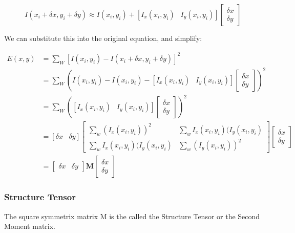 \begin{equation}
    I(x_{i} + \delta x,y_{i} + \delta y) \approx I(x_{i},y_{i}) + [ I_{x}(x_{i},y_{i}) \;\;\: I_{y}(x_{i},y_{i})  ] \begin{bmatrix} \delta x \\ \delta y \end{bmatrix}
\end{equation}

\noindent We can substitute this into the original equation, and simplify:

\begin{align*}
    E(x,y) &= \sum_{W}[ I(x_{i},y_{i}) - I(x_{i} + \delta x,y_{i} + \delta y) ]^2 \\
    &= \sum_{W} (I(x_{i}, y_{i}) - I(x_{i},y_{i}) - [ I_{x}(x_{i},y_{i}) \;\;\: I_{y}(x_{i},y_{i})  ] \begin{bmatrix} \delta x \\ \delta y \end{bmatrix})^2 \\
    &= \sum_{W}([ I_{x}(x_{i},y_{i}) \;\;\: I_{y}(x_{i},y_{i})  ] \begin{bmatrix} \delta x \\ \delta y \end{bmatrix})^2 \\
    &= [\delta x \;\;\; \delta y] \begin{bmatrix} \sum_{w} (I_{x}(x_{i},y_{i}))^2 & \sum_{w} I_{x}(x_{i},y_{i})(I_{y}(x_{i},y_{i}) \\[0.2cm] \sum_{w} I_{x}(x_{i},y_{i})(I_{y}(x_{i},y_{i}) & \sum_{w} (I_{y}(x_{i},y_{i}))^2  \end{bmatrix}\begin{bmatrix} \delta x \\ \delta y \end{bmatrix} \\
    &= \begin{bmatrix} \delta x & \delta y \end{bmatrix}\textbf{M}\begin{bmatrix} \delta x \\ \delta y \end{bmatrix}
\end{align*}

\subsubsection{Structure Tensor}

The square symmetrix matrix M is the called the Structure Tensor or the Second Moment matrix.

